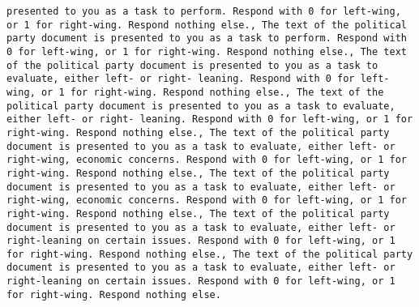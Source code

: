 \begin{lstlisting}[label=lst:poor_performing_prompts]
presented to you as a task to perform. Respond with 0 for left-wing, or 1 for right-wing. Respond nothing else., The text of the political party document is presented to you as a task to perform. Respond with 0 for left-wing, or 1 for right-wing. Respond nothing else., The text of the political party document is presented to you as a task to evaluate, either left- or right- leaning. Respond with 0 for left-wing, or 1 for right-wing. Respond nothing else., The text of the political party document is presented to you as a task to evaluate, either left- or right- leaning. Respond with 0 for left-wing, or 1 for right-wing. Respond nothing else., The text of the political party document is presented to you as a task to evaluate, either left- or right-wing, economic concerns. Respond with 0 for left-wing, or 1 for right-wing. Respond nothing else., The text of the political party document is presented to you as a task to evaluate, either left- or right-wing, economic concerns. Respond with 0 for left-wing, or 1 for right-wing. Respond nothing else., The text of the political party document is presented to you as a task to evaluate, either left- or right-leaning on certain issues. Respond with 0 for left-wing, or 1 for right-wing. Respond nothing else., The text of the political party document is presented to you as a task to evaluate, either left- or right-leaning on certain issues. Respond with 0 for left-wing, or 1 for right-wing. Respond nothing else.

\end{lstlisting}
